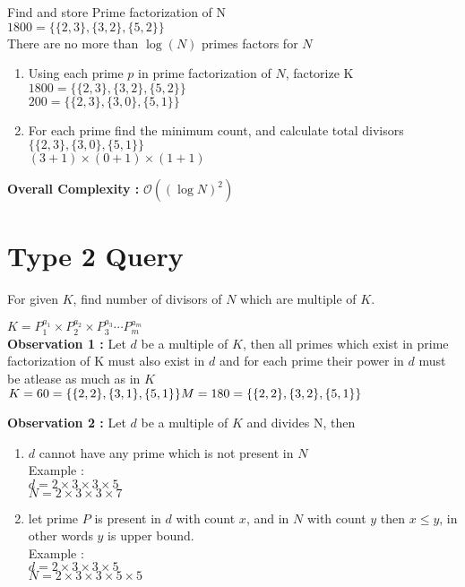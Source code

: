 \documentclass[12pt]{article}
\begin{document}
	Find and store Prime factorization of N \\
	$1800 = \{\{2, 3\}, \{3, 2\}, \{5, 2\}\}$ \\
	There are no more than $\log(N)$ primes factors for $N$ \\
	\begin{enumerate}
		\item Using each prime $p$ in prime factorization of $N$, factorize K \\
		$1800 = \{\{2, 3\}, \{3, 2\}, \{5, 2\}\}$ \\
		$200 = \{\{2, 3\}, \{3, 0\}, \{5, 1\}\}$
		
		\item For each prime find the minimum count, and calculate total divisors \\
		$\{\{2, 3\}, \{3, 0\}, \{5, 1\}\}$ \\
		$(3 + 1) \times (0 + 1) \times (1 + 1)$ \\

	\end{enumerate}

	\textbf{Overall Complexity : }
	$\mathcal{O}((\log{N})^2)$

    \section{Type 2 Query}

    For given $K$, find number of divisors of $N$ which are multiple of $K$.

    $K = P_1^{a_1} \times P_2^{a_2} \times P_3^{a_3} \cdots P_m^{a_m}$ \\
    \textbf{Observation 1 : } Let $d$ be a multiple of $K$, then all primes which exist in prime factorization of K must also exist in $d$ and for each prime their power in $d$ must be atlease as much as in $K$ \\

    $K = 60 = \{\{2, 2\}, \{3, 1\}, \{5, 1\}\} \\ M = 180 = \{\{2, 2\}, \{3, 2\}, \{5, 1\}\}$

    \textbf{Observation 2 : } Let $d$ be a multiple of $K$ and divides N, then 
    \begin{enumerate}
        \item $d$ cannot have any prime which is not present in $N$ \\
        Example : \\
        $d = 2 \times 3 \times 3 \times 5$ \\
        $N = 2 \times 3 \times 3 \times 7$
        \item let prime $P$ is present in $d$ with count $x$, and in $N$ with count $y$ then $x \leq y$, in other words $y$ is upper bound. \\
        Example : \\
        $d = 2 \times 3 \times 3 \times 5$ \\
        $N = 2 \times 3 \times 3 \times 5 \times 5$


    \end{enumerate}
\end{document}
